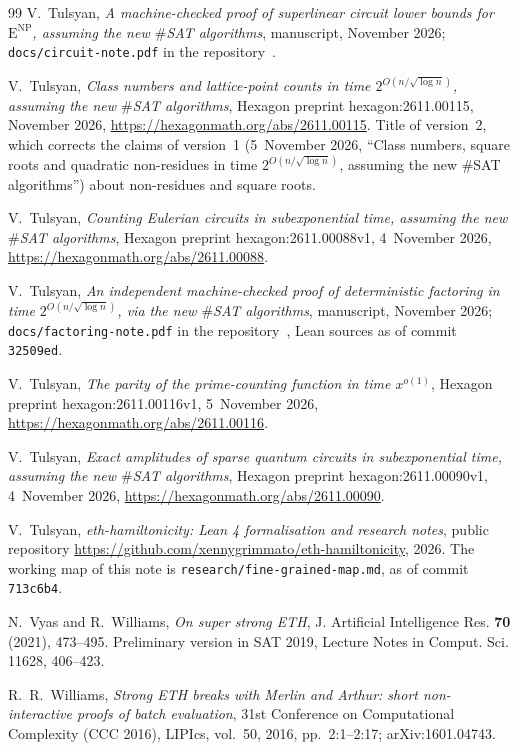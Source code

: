 \documentclass[10pt]{amsart}
\theoremstyle{plain}
\theoremstyle{definition}
\theoremstyle{remark}
\numberwithin{equation}{section}
\begin{document}
\begin{thebibliography}{99}
V.~Tulsyan, \emph{A machine-checked proof of superlinear circuit lower bounds for
$\mathrm{E}^{\mathrm{NP}}$, assuming the new $\#${SAT} algorithms}, manuscript, November 2026;
\texttt{docs/circuit-note.pdf} in the repository~\cite{TulsyanRepo26}.

V.~Tulsyan, \emph{Class numbers and lattice-point counts in time $2^{O(n/\sqrt{\log n})}$, assuming the
new $\#${SAT} algorithms}, Hexagon preprint hexagon:2611.00115, November 2026,
\url{https://hexagonmath.org/abs/2611.00115}. Title of version~2, which corrects the claims of
version~1 (5~November 2026, ``Class numbers, square roots and quadratic non-residues in time
$2^{O(n/\sqrt{\log n})}$, assuming the new $\#${SAT} algorithms'') about non-residues and square roots.

V.~Tulsyan, \emph{Counting {E}ulerian circuits in subexponential time, assuming the new $\#${SAT}
algorithms}, Hexagon preprint hexagon:2611.00088v1, 4~November 2026,
\url{https://hexagonmath.org/abs/2611.00088}.

V.~Tulsyan, \emph{An independent machine-checked proof of deterministic factoring in time
$2^{O(n/\sqrt{\log n})}$, via the new $\#${SAT} algorithms}, manuscript, November 2026;
\texttt{docs/factoring-note.pdf} in the repository~\cite{TulsyanRepo26}, Lean sources as of commit
\texttt{32509ed}.

V.~Tulsyan, \emph{The parity of the prime-counting function in time $x^{o(1)}$}, Hexagon preprint
hexagon:2611.00116v1, 5~November 2026, \url{https://hexagonmath.org/abs/2611.00116}.

V.~Tulsyan, \emph{Exact amplitudes of sparse quantum circuits in subexponential time, assuming the
new $\#${SAT} algorithms}, Hexagon preprint hexagon:2611.00090v1, 4~November 2026,
\url{https://hexagonmath.org/abs/2611.00090}.

V.~Tulsyan, \emph{eth-hamiltonicity: {L}ean 4 formalisation and research notes}, public repository
\url{https://github.com/xennygrimmato/eth-hamiltonicity}, 2026. The working map of this note is
\texttt{research/fine-grained-map.md}, as of commit \texttt{713c6b4}.

N.~Vyas and R.~Williams, \emph{On super strong {ETH}}, J. Artificial Intelligence Res. \textbf{70}
(2021), 473--495. Preliminary version in SAT 2019, Lecture Notes in Comput. Sci. 11628, 406--423.

R.~R.~Williams, \emph{Strong {ETH} breaks with {M}erlin and {A}rthur: short non-interactive proofs of
batch evaluation}, 31st Conference on Computational Complexity (CCC 2016), LIPIcs, vol.~50, 2016,
pp.~2:1--2:17; arXiv:1601.04743.


\end{thebibliography}
\end{document}
